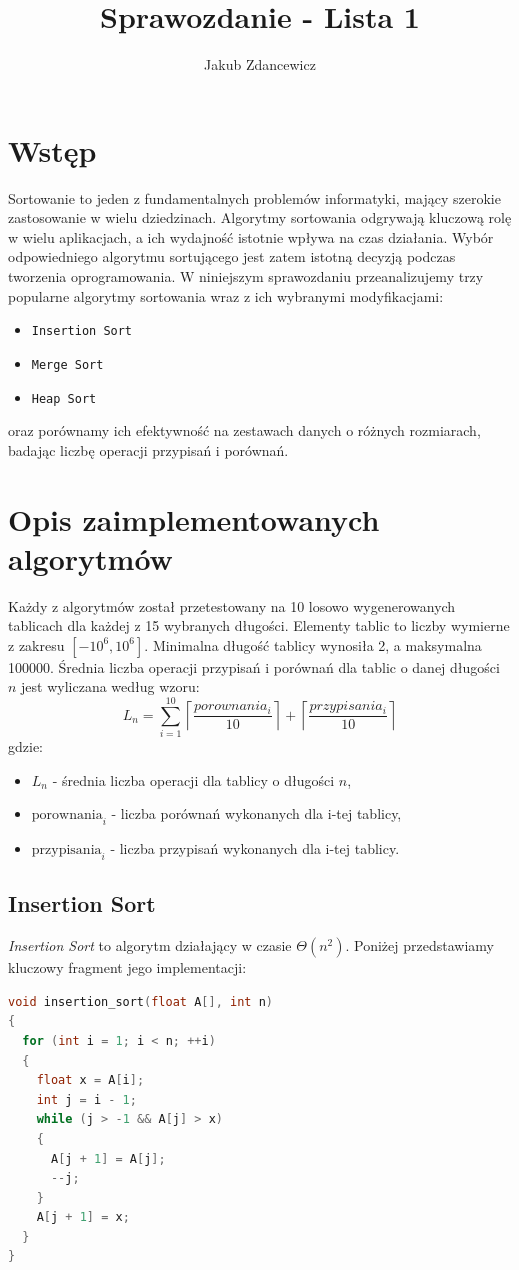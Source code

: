 \documentclass{article}
\title{Sprawozdanie - Lista 1}
\author{Jakub Zdancewicz}
\date{}
\begin{document}
\maketitle

\tableofcontents
\newpage

\section{Wstęp}
Sortowanie to jeden z fundamentalnych problemów informatyki, mający szerokie zastosowanie w wielu dziedzinach. Algorytmy sortowania odgrywają kluczową rolę w wielu aplikacjach, a ich wydajność istotnie wpływa na czas działania. Wybór odpowiedniego algorytmu sortującego jest zatem istotną decyzją podczas tworzenia oprogramowania. W niniejszym sprawozdaniu przeanalizujemy trzy popularne algorytmy sortowania wraz z ich wybranymi modyfikacjami:
\begin{itemize}
    \item \texttt{Insertion Sort}
    \item \texttt{Merge Sort}
    \item \texttt{Heap Sort}
\end{itemize}
oraz porównamy ich efektywność na zestawach danych o różnych rozmiarach, badając liczbę operacji przypisań i porównań.


\section{Opis zaimplementowanych algorytmów}
Każdy z algorytmów został przetestowany na 10 losowo wygenerowanych tablicach dla każdej z 15 wybranych długości. Elementy tablic to liczby wymierne z zakresu $[-10^6, 10^6]$. Minimalna długość tablicy wynosiła 2, a maksymalna 100000. Średnia liczba operacji przypisań i porównań dla tablic o danej długości $n$ jest wyliczana według wzoru:
\[
    L_n = \sum_{i=1}^{10} \left\lceil\frac{porownania_i}{10}\right\rceil + \left\lceil\frac{przypisania_i}{10}\right\rceil
\]
gdzie:
\begin{itemize}
    \item[] $L_n$ - średnia liczba operacji dla tablicy o długości $n$,
    \item[] $\text{porownania}_i$ - liczba porównań wykonanych dla i-tej tablicy,
    \item[] $\text{przypisania}_i$ - liczba przypisań wykonanych dla i-tej tablicy.
\end{itemize}

\newpage
\subsection{Insertion Sort}
\textit{Insertion Sort} to algorytm działający w czasie $\Theta(n^2)$. Poniżej przedstawiamy kluczowy fragment jego implementacji:
\begin{lstlisting}[style=mystyle, language=C++, caption={Implementacja \texttt{Insertion Sort}}, label={lst:insertion}]
void insertion_sort(float A[], int n)
{
  for (int i = 1; i < n; ++i)
  {
    float x = A[i];
    int j = i - 1;
    while (j > -1 && A[j] > x)
    {
      A[j + 1] = A[j];
      --j;
    }
    A[j + 1] = x;
  }
}
\end{lstlisting}
\end{document}
